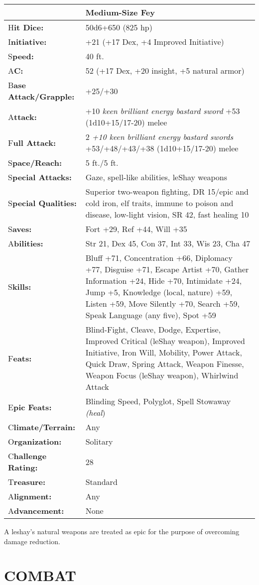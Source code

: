 \documentclass{article}
\begin{document}
{\begin{tabular}{|>{\raggedright}p{66pt}|>{\raggedright}p{259pt}|}
\hline
  & Medium-Size Fey \tabularnewline
\hline
H\textbf{it Dice:} & 50d6+650 (825 hp) \tabularnewline
\hline
I\textbf{nitiative:} & +21 (+17 Dex, +4 Improved Initiative) \tabularnewline
\hline
S\textbf{peed:} & 40 ft. \tabularnewline
\hline
A\textbf{C:} & 52 (+17 Dex, +20 insight, +5 natural armor) \tabularnewline
\hline
B\textbf{ase Attack/Grapple:} & +25/+30\tabularnewline
\hline
A\textbf{ttack:} & +10 \textit{keen brilliant energy bastard sword} +53 (1d10+15/17-20) 
melee\tabularnewline
\hline
F\textbf{ull Attack:} & 2 \textit{+10 keen brilliant energy bastard swords }+53/+48/+43/+38 
(1d10+15/17-20) melee\tabularnewline
\hline
S\textbf{pace/Reach:} & 5 ft./5 ft. \tabularnewline
\hline
S\textbf{pecial Attacks:} & Gaze, spell-like abilities, leShay weapons \tabularnewline
\hline
S\textbf{pecial Qualities:} & Superior two-weapon fighting, DR 15/epic and cold 
iron, elf traits, immune to poison and disease, low-light vision, SR 42, fast healing 
10 \tabularnewline
\hline
S\textbf{aves:} & Fort +29, Ref +44, Will +35 \tabularnewline
\hline
A\textbf{bilities:} & Str 21, Dex 45, Con 37, Int 33, Wis 23, Cha 47 \tabularnewline
\hline
S\textbf{kills:} & Bluff +71, Concentration +66, Diplomacy +77, Disguise +71, Escape 
Artist +70, Gather Information +24, Hide +70, Intimidate +24, Jump +5, Knowledge 
(local, nature) +59, Listen +59, Move Silently +70, Search +59, Speak Language 
(any five), Spot +59\tabularnewline
\hline
F\textbf{eats:} & Blind-Fight, Cleave, Dodge, Expertise, Improved Critical (leShay 
weapon), Improved Initiative, Iron Will, Mobility, Power Attack, Quick Draw, Spring 
Attack, Weapon Finesse, Weapon Focus (leShay weapon), Whirlwind Attack \tabularnewline
\hline
E\textbf{pic Feats:} & Blinding Speed, Polyglot, Spell Stowaway \textit{(heal}) 
\tabularnewline
\hline
C\textbf{limate/Terrain:} & Any \tabularnewline
\hline
O\textbf{rganization:} & Solitary \tabularnewline
\hline
C\textbf{hallenge Rating:} & 28 \tabularnewline
\hline
T\textbf{reasure:} & Standard \tabularnewline
\hline
A\textbf{lignment:} & Any \tabularnewline
\hline
A\textbf{dvancement:} & None \tabularnewline
\hline
\end{tabular}

A leshay's natural weapons are treated as epic for the purpose of overcoming damage 
reduction.

\section*{COMBAT }

}
\end{document}

